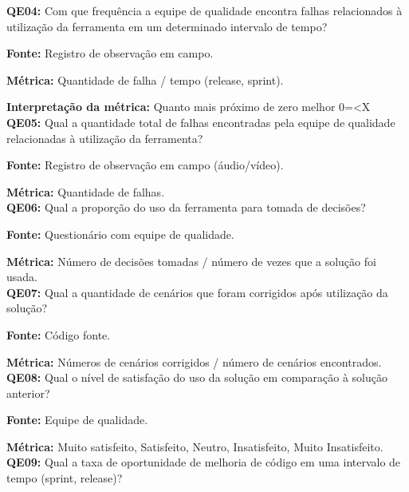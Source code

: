 
\textbf{QE04: } Com que frequência a equipe de qualidade encontra falhas relacionados à utilização da ferramenta em um determinado intervalo de tempo?

\textbf{Fonte:} Registro de observação em campo.

\textbf{Métrica:} Quantidade de falha / tempo (release, sprint).

\textbf{Interpretação da métrica:} Quanto mais próximo de zero melhor 0=<X\\



\textbf{QE05: } Qual a quantidade total de falhas encontradas pela equipe de qualidade relacionadas à utilização da ferramenta?

\textbf{Fonte:} Registro de observação em campo (áudio/vídeo).

\textbf{Métrica:} Quantidade de falhas.\\



\textbf{QE06: } Qual a proporção do uso da ferramenta para tomada de decisões?

\textbf{Fonte:} Questionário com equipe de qualidade.

\textbf{Métrica:} Número de decisões tomadas / número de vezes que a solução foi usada.\\




\textbf{QE07: } Qual a quantidade de cenários que foram corrigidos após utilização da solução?

\textbf{Fonte:} Código fonte.

\textbf{Métrica:} Números de cenários corrigidos / número de cenários encontrados.\\



\textbf{QE08: } Qual o nível de satisfação do uso da solução em comparação à solução anterior? 

\textbf{Fonte:} Equipe de qualidade.

\textbf{Métrica:} Muito satisfeito, Satisfeito, Neutro, Insatisfeito, Muito Insatisfeito.\\



\textbf{QE09: } Qual a taxa de oportunidade de melhoria de código em uma intervalo de tempo (sprint, release)? 

